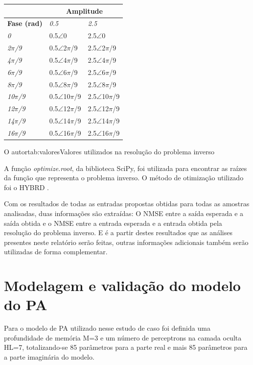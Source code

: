 {
\begin{tabular}{l|l|l}
\hline
    & \multicolumn{2}{c}{\textbf{Amplitude}} \\ \hline
    \textbf{Fase (rad)} & \textit{0.5} & \textit{2.5} \\ \hline
    \textit{0}& 0.5$\angle$0 & 2.5$\angle$0 \\ \hline
    \textit{2$\pi$/9} & 0.5$\angle$2$\pi$/9  & 2.5$\angle$2$\pi$/9  \\ \hline
    \textit{4$\pi$/9} & 0.5$\angle$4$\pi$/9  & 2.5$\angle$4$\pi$/9  \\ \hline
    \textit{6$\pi$/9} & 0.5$\angle$6$\pi$/9  & 2.5$\angle$6$\pi$/9  \\ \hline
    \textit{8$\pi$/9} & 0.5$\angle$8$\pi$/9  & 2.5$\angle$8$\pi$/9  \\ \hline
    \textit{10$\pi$/9}& 0.5$\angle$10$\pi$/9 & 2.5$\angle$10$\pi$/9 \\ \hline
    \textit{12$\pi$/9}& 0.5$\angle$12$\pi$/9 & 2.5$\angle$12$\pi$/9 \\ \hline
    \textit{14$\pi$/9}& 0.5$\angle$14$\pi$/9 & 2.5$\angle$14$\pi$/9 \\ \hline
    \textit{16$\pi$/9}& 0.5$\angle$16$\pi$/9 & 2.5$\angle$16$\pi$/9 \\ \hline
\end{tabular}
\label{tab:valores}
}
{O autor}{tab:valores}{}{Valores utilizados na resolução do problema inverso}

A função \textit{optimize.root}, da biblioteca SciPy, foi utilizada para encontrar as raízes da função que representa o problema inverso. O método de otimização utilizado foi o HYBRD \cite{powell1970hybrid}.

Com os resultados de todas as entradas propostas obtidas para todas as amostras analisadas, duas informações são extraídas: O NMSE entre a saída esperada e a saída obtida e o NMSE entre a entrada esperada e a entrada obtida pela resolução do problema inverso. E é a partir destes resultados que as análises presentes neste relatório serão feitas, outras informações adicionais também serão utilizadas de forma complementar.

\section{Modelagem e validação do modelo do PA} \label{sec:estudoi-model}
Para o modelo de PA utilizado nesse estudo de caso foi definida uma profundidade de memória M=3 e um número de perceptrons na camada oculta HL=7, totalizando-se 85 parâmetros para a parte real e mais 85 parâmetros para a parte imaginária do modelo.

